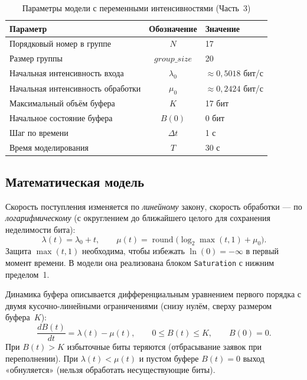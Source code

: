 \documentclass[a4paper,12pt]{article}
\begin{document}
\begin{table}[h!]
    \centering
    \caption{Параметры модели с переменными интенсивностями (Часть~3)}
    \label{tab:params3}
    \begin{tabular}{|l|c|l|}
        \hline
        Параметр & Обозначение & Значение \\
        \hline
        Порядковый номер в группе       & $N$              & 17 \\
        Размер группы                   & $group\_size$    & 20 \\
        Начальная интенсивность входа   & $\lambda_{0}$    & $\approx 0{,}5018$ бит/с \\
        Начальная интенсивность обработки & $\mu_{0}$      & $\approx 0{,}2424$ бит/с \\
        Максимальный объём буфера       & $K$              & 17 бит \\
        Начальное состояние буфера      & $B(0)$           & 0 бит \\
        Шаг по времени                  & $\Delta t$       & 1 с \\
        Время моделирования             & $T$              & 30 с \\
        \hline
    \end{tabular}
\end{table}

\subsection*{Математическая модель}
Скорость поступления изменяется по \emph{линейному} закону, скорость обработки --- по
\emph{логарифмическому} (с округлением до ближайшего целого для сохранения неделимости
бита):
\[
\lambda(t) = \lambda_{0} + t, \qquad
\mu(t) = \operatorname{round}\!\bigl(\log_{2}\!\max(t,1) + \mu_{0}\bigr).
\]
Защита \(\max(t,1)\) необходима, чтобы избежать \(\ln(0)=-\infty\) в первый момент
времени. В модели она реализована блоком \texttt{Saturation} с нижним пределом~1.

Динамика буфера описывается дифференциальным уравнением первого порядка с двумя
кусочно-линейными ограничениями (снизу нулём, сверху размером буфера~$K$):
\[
\frac{dB(t)}{dt} = \lambda(t) - \mu(t), \qquad
0 \leqslant B(t) \leqslant K, \qquad B(0)=0.
\]
При $B(t) > K$ избыточные биты теряются (отбрасывание заявок при переполнении).
При $\lambda(t)<\mu(t)$ и пустом буфере $B(t)=0$ выход «обнуляется» (нельзя
обработать несуществующие биты).
\end{document}
